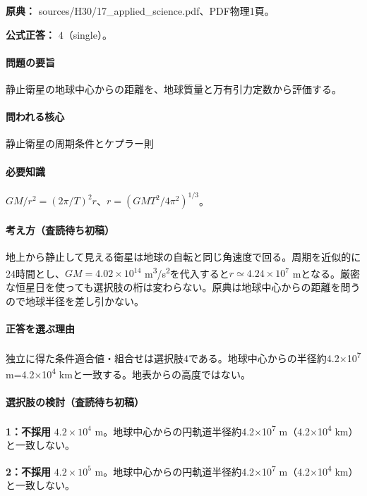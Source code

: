 \noindent\textbf{原典：} sources/H30/17\_applied\_science.pdf、PDF物理1頁。

\textbf{公式正答：} 4（single）。

\paragraph{問題の要旨} 静止衛星の地球中心からの距離を、地球質量と万有引力定数から評価する。

\paragraph{問われる核心} 静止衛星の周期条件とケプラー則

\paragraph{必要知識} \(GM/r^2=(2\pi/T)^2r\)、\(r=(GMT^2/4\pi^2)^{1/3}\)。

\paragraph{考え方（査読待ち初稿）} 地上から静止して見える衛星は地球の自転と同じ角速度で回る。周期を近似的に24時間とし、\(GM=4.02\times10^{14}\) m\textsuperscript{3}/s\textsuperscript{2}を代入すると\(r\simeq4.24\times10^7\) mとなる。厳密な恒星日を使っても選択肢の桁は変わらない。原典は地球中心からの距離を問うので地球半径を差し引かない。

\paragraph{正答を選ぶ理由} 独立に得た条件適合値・組合せは選択肢4である。地球中心からの半径約4.2×10\textsuperscript{7} m=4.2×10\textsuperscript{4} kmと一致する。地表からの高度ではない。

\paragraph{選択肢の検討（査読待ち初稿）}

\noindent\textbf{1：不採用} \(4.2\times10^4\) m。地球中心からの円軌道半径約4.2×10\textsuperscript{7} m（4.2×10\textsuperscript{4} km）と一致しない。\par

\noindent\textbf{2：不採用} \(4.2\times10^5\) m。地球中心からの円軌道半径約4.2×10\textsuperscript{7} m（4.2×10\textsuperscript{4} km）と一致しない。\par

